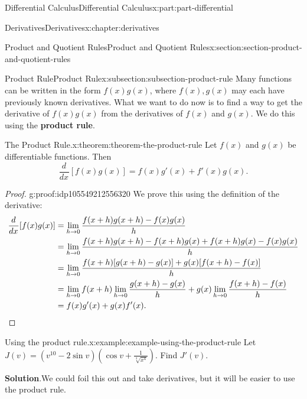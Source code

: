 \documentclass[twoside,10pt,]{book}
\newcommand{\blocktitlefont}{\relax}
\newcommand{\terminology}[1]{\textbf{#1}}
\numberwithin{equation}{part}
\newcommand{\qedhere}{\relax}
\newcommand{\dv}[3][]{\dfrac{d^{#1} #2}{d #3^{#1}}}
\begin{document}
\begin{partptx}{Differential Calculus}{}{Differential Calculus}{}{}{x:part:part-differential}
\begin{chapterptx}{Derivatives}{}{Derivatives}{}{}{x:chapter:derivatives}
\typeout{************************************************}
%
\begin{sectionptx}{Product and Quotient Rules}{}{Product and Quotient Rules}{}{}{x:section:section-product-and-quotient-rules}
%
%
\typeout{************************************************}
\typeout{************************************************}
%
\begin{subsectionptx}{Product Rule}{}{Product Rule}{}{}{x:subsection:subsection-product-rule}
Many functions can be written in the form \(f(x)g(x)\), where \(f(x),g(x)\) may each have previously known derivatives. What we want to do now is to find a way to get the derivative of \(f(x)g(x)\) from the derivatives of \(f(x)\) and \(g(x)\). We do this using the \terminology{product rule}.%
\begin{theorem}{The Product Rule.}{}{x:theorem:theorem-the-product-rule}%
%
Let \(f(x)\) and \(g(x)\) be differentiable functions. Then%
\begin{equation*}
\dv{}{x}[f(x)g(x)] = f(x)g'(x) + f'(x)g(x).
\end{equation*}
%
\end{theorem}
\begin{proof}{}{g:proof:idp105549212556320}
We prove this using the definition of the derivative:%
\begin{align*}
\dv{}{x}[f(x)g(x)] & = \lim_{h\to0}\frac{f(x+h)g(x+h) - f(x)g(x)}{h} \\
& = \lim_{h\to0}\frac{f(x+h)g(x+h) - f(x+h)g(x) + f(x+h)g(x) - f(x)g(x)}{h} \\
& = \lim_{h\to0}\frac{f(x+h)[g(x+h) - g(x)] + g(x)[f(x+h) - f(x)]}{h} \\
& = \lim_{h\to0}f(x+h)\lim_{h\to0}\frac{g(x+h) - g(x)}{h} + g(x)\lim_{h\to0}\frac{f(x+h) - f(x)}{h} \\
& = f(x)g'(x) + g(x)f'(x). \qedhere
\end{align*}
%
\end{proof}
\begin{example}{Using the product rule.}{x:example:example-using-the-product-rule}%
Let \(J(v) = (v^{10} - 2\sin v)(\cos v + \frac{1}{\sqrt[3]{x^{4}}})\). Find \(J'(v)\).%
\par\smallskip%
\noindent\textbf{\blocktitlefont Solution}.\hypertarget{g:solution:idp105549213018144}{}\quad{}We could foil this out and take derivatives, but it will be easier to use the product rule.%
\end{example}

\end{subsectionptx}
\end{sectionptx}
\end{chapterptx}
\end{partptx}
\end{document}
